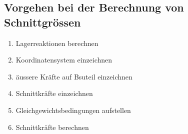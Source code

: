 \subsection{Vorgehen bei der Berechnung von Schnittgrössen}
\begin{enumerate}
  \item Lagerreaktionen berechnen
  \item Koordinatensystem einzeichnen
  \item äussere Kräfte auf Bsuteil einzeichnen
  \item Schnittkräfte einzeichnen
  \item Gleichgewichtsbedingungen aufstellen
  \item Schnittkräfte berechnen
\end{enumerate}